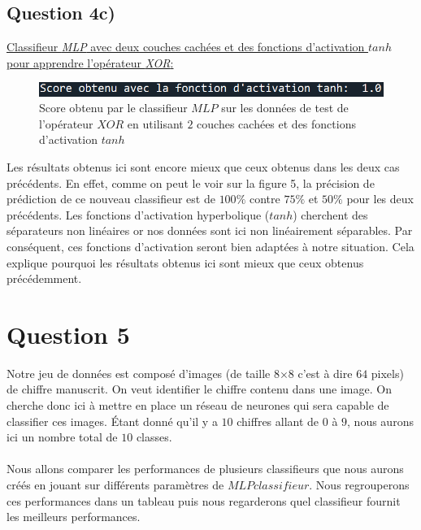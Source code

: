 \documentclass[a4paper,french,10pt]{article}
\begin{document}
	\pagebreak
	
	\subsection{Question 4c)}
	
	\underline{Classifieur \textit{MLP} avec deux couches cachées et des fonctions d'activation $tanh$ pour apprendre l’opérateur \textit{XOR}:}
	
	
	
	\begin{figure}[H]
		\centering
		\includegraphics[scale=0.7]{images/Q4c.png}
		\caption{Score obtenu par le classifieur $MLP$ sur les données de test de l'opérateur $XOR$ en utilisant $2$ couches cachées et des fonctions d'activation $tanh$}
	\end{figure}
	Les résultats obtenus ici sont encore mieux que ceux obtenus dans les deux cas précédents. En effet, comme on peut le voir sur la figure 5, la précision de prédiction de ce nouveau classifieur est de $100\%$ contre $75\%$ et $50\%$ pour les deux précédents.
	Les fonctions d'activation hyperbolique ($tanh$) cherchent des séparateurs non linéaires or nos données sont ici non linéairement séparables. Par conséquent, ces fonctions d'activation seront bien adaptées à notre situation. Cela explique pourquoi les résultats obtenus ici sont mieux que ceux obtenus précédemment.
	
	\section{Question 5}
	
	Notre jeu de données est composé d'images (de taille 8$\times$8 c'est à dire $64$ pixels) de chiffre manuscrit. On veut identifier le chiffre contenu dans une image. On cherche donc ici à mettre en place un réseau de neurones qui sera capable de classifier ces images. Étant donné qu'il y a $10$ chiffres allant de $0$ à $9$, nous aurons ici un nombre total de $10$ classes.\\\\
	
	Nous allons comparer les performances de plusieurs classifieurs que nous aurons créés en jouant sur différents paramètres de $MLPclassifieur$. Nous regrouperons ces performances dans un tableau puis nous regarderons quel classifieur fournit les meilleurs performances.
	
\end{document}
